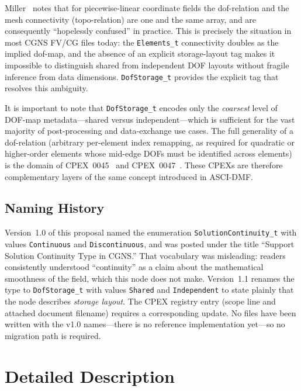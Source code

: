 \documentclass[11pt,letterpaper]{article}
\begin{document}
Miller~\cite{miller2003} notes that for piecewise-linear coordinate fields the dof-relation
and the mesh connectivity (topo-relation) are one and the same array, and are consequently
``hopelessly confused'' in practice.  This is precisely the situation in most CGNS FV/CG
files today: the \texttt{Elements\_t} connectivity doubles as the implied dof-map, and the
absence of an explicit storage-layout tag makes it impossible to distinguish shared from
independent DOF layouts without fragile inference from data dimensions.
\texttt{DofStorage\_t} provides the explicit tag that resolves this ambiguity.

It is important to note that \texttt{DofStorage\_t} encodes only the \emph{coarsest} level
of DOF-map metadata---shared versus independent---which is sufficient for the vast majority
of post-processing and data-exchange use cases.  The full generality of a dof-relation
(arbitrary per-element index remapping, as required for quadratic or higher-order elements
whose mid-edge DOFs must be identified across elements) is the domain of
CPEX~0045~\cite{cpex0045} and CPEX~0047~\cite{cpex0047}.  These CPEXs are therefore
complementary layers of the same concept introduced in ASCI-DMF.

\subsection{Naming History}
\label{sec:naming-history}

Version~1.0 of this proposal named the enumeration \texttt{SolutionContinuity\_t} with
values \texttt{Continuous} and \texttt{Discontinuous}, and was posted under the title
``Support Solution Continuity Type in CGNS.''  That vocabulary was misleading: readers
consistently understood ``continuity'' as a claim about the mathematical smoothness of
the field, which this node does not make.  Version~1.1 renames the type to
\texttt{DofStorage\_t} with values \texttt{Shared} and \texttt{Independent} to state
plainly that the node describes \emph{storage layout}.  The CPEX registry entry
(scope line and attached document filename) requires a corresponding update.  No files
have been written with the v1.0 names---there is no reference implementation yet---so no
migration path is required.

\section{Detailed Description}
\end{document}
